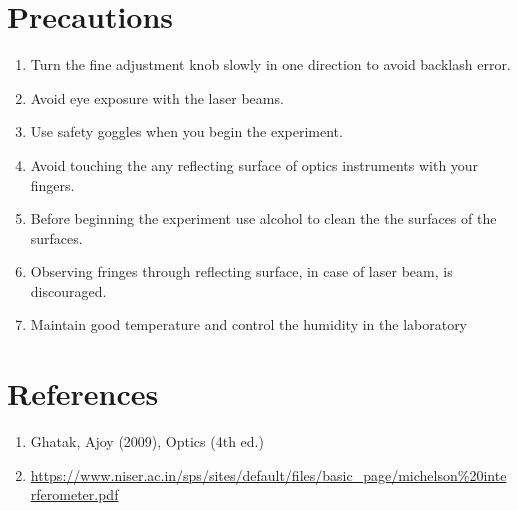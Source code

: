 \documentclass[a4paper, amsfonts, amssymb, amsmath, reprint, showkeys, nofootinbib, twoside]{revtex4-1}
\begin{document}
\section{Precautions}
\begin{enumerate}
\item{Turn the fine adjustment knob slowly in one direction to avoid backlash error.}
\item{Avoid eye exposure with the laser beams.}
\item{Use safety goggles when you begin the experiment.}
\item{Avoid touching the any reflecting surface of optics instruments with your fingers.}
\item{Before beginning the experiment use alcohol to clean the the surfaces of the surfaces.}
\item{Observing fringes through reflecting surface, in case of laser beam, is discouraged.}
\item{Maintain good temperature and control the humidity in the laboratory}
\end{enumerate}

\section{References}
\begin{enumerate}
\item{Ghatak, Ajoy (2009), Optics (4th ed.)}
\item{\url{https://www.niser.ac.in/sps/sites/default/files/basic_page/michelson%20interferometer.pdf}}
\end{enumerate}
\end{document}

